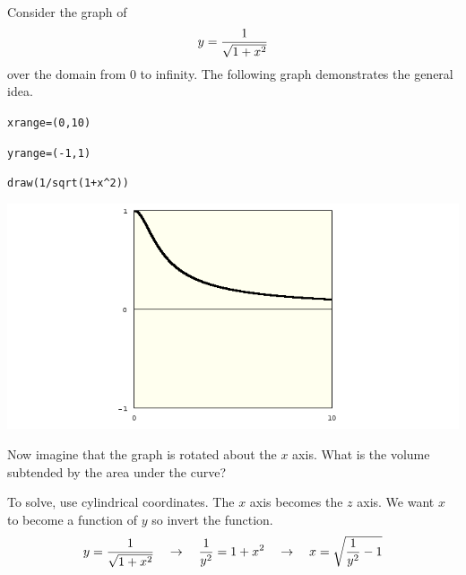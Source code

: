 
\newpage

\subsection{}
Consider the graph of
$$y={1\over\sqrt{1+x^2}}$$
over the domain from 0 to infinity.
The following graph demonstrates the general idea.

\medskip
\verb$xrange=(0,10)$

\verb$yrange=(-1,1)$

\verb$draw(1/sqrt(1+x^2))$

\begin{center}
\includegraphics[scale=0.4]{16.png}
\end{center}

\medskip
\noindent
Now imagine that the graph is rotated about the $x$ axis.
What is the volume subtended by the area under the curve?

\medskip
\noindent
To solve, use cylindrical coordinates.
The $x$ axis becomes the $z$ axis.
We want $x$ to become a function of $y$ so invert the function.
$$y={1\over\sqrt{1+x^2}}
\quad\rightarrow\quad
{1\over y^2}=1+x^2
\quad\rightarrow\quad
x=\sqrt{{1\over y^2}-1}
$$

